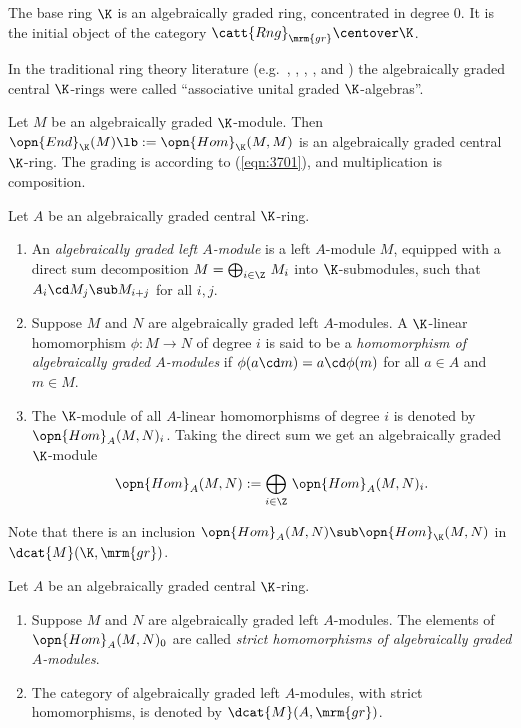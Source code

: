 The base ring $\K$ is an algebraically graded ring, concentrated in degree $0$.
It is the initial object of the category 
$\catt{Rng}_{\mrm{gr}} \centover \K$. 

In the traditional ring theory literature (e.g.\ \cite{McRo}, \cite{Row}, 
\cite{ATV}, \cite{ArZh}, \cite{Ye1} and \cite{YeZh0}) the algebraically graded 
central $\K$-rings were called ``associative unital graded $\K$-algebras''. 

\begin{exa} \label{exa:3701}
Let $M$ be an algebraically graded $\K$-module. Then 
$\opn{End}_{\K}(M) \lb  := \opn{Hom}_{\K}(M, M)$
is an algebraically graded central $\K$-ring.
The grading is according to (\ref{eqn:3701}), and multiplication is 
composition. 
\end{exa}

\begin{dfn}  \label{dfn:3702}
Let $A$ be an algebraically graded central $\K$-ring.
\begin{enumerate}
\item An {\em algebraically graded left $A$-module} 
is a left $A$-module $M$, equipped with a direct sum decomposition 
$M = \bigoplus_{i \in \Z} \, M_i$
into $\K$-submodules, such that 
$A_i \cd M_j \sub M_{i + j}$ for all $i, j$.

\item Suppose $M$ and $N$ are algebraically graded left $A$-modules.
A $\K$-linear homomorphism $\phi : M \to N$ of degree $i$ is said to be a
{\em homomorphism of algebraically graded $A$-modules}
if $\phi(a \cd m) = a \cd \phi(m)$
for all $a \in A$ and $m \in M$. 

\item The $\K$-module of all $A$-linear homomorphisms of degree $i$ is denoted 
by $\opn{Hom}_{A}(M, N)_i$. Taking the direct sum we get an algebraically 
graded 
$\K$-module
\[ \opn{Hom}_{A}(M, N) := \bigoplus_{i \in \Z} \, \opn{Hom}_{A}(M, N)_i . \]
\end{enumerate}
\end{dfn}

Note that there is an inclusion 
$\opn{Hom}_{A}(M, N) \sub \opn{Hom}_{\K}(M, N)$
in $\dcat{M}(\K, \mrm{gr})$.

\begin{dfn}  \label{dfn:3704}
Let $A$ be an algebraically graded central $\K$-ring.
\begin{enumerate}
\item Suppose $M$ and $N$ are algebraically graded left $A$-modules.
The elements of $\opn{Hom}_{A}(M, N)_0$ are called 
{\em strict homomorphisms of algebraically graded $A$-modules}. 

\item The category of algebraically graded left $A$-modules, with strict 
homomorphisms, is denoted by $\dcat{M}(A, \mrm{gr})$. 
\end{enumerate}
\end{dfn}

